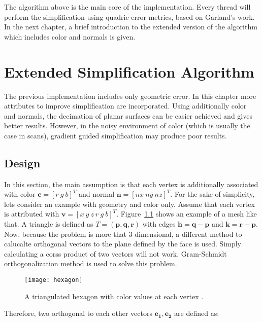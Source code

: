 The algorithm above is the main core of the implementation. Every thread will perform the simplification using quadric error metrics, based on Garland's work. In the next chapter, a brief introduction to the extended version of the algorithm which includes color and normals is given.

\chapter{Extended Simplification Algorithm}

The previous implementation includes only geometric error. In this chapter more attributes to improve simplification are incorporated. Using additionally color and normals, the decimation of planar surfaces can be easier achieved and gives better results. However, in the noisy environment of color (which is usually the case in scans), gradient guided simplification may produce poor results.

\section{Design}
In this section, the main assumption is that each vertex is additionally associated with color $\mathbf{c} = [r \ g \ b]^T$ and normal $\mathbf{n} = [nx \ ny \ nz]^T$. For the sake of simplicity, lets consider an example with geometry and color only. Assume that each vertex is attributed with $\mathbf{v} = [x \ y \ z \ r \ g \ b]^T$. Figure~\ref{fig:hexagon} shows an example of a mesh like that. A triangle is defined as $T = (\mathbf{p}, \mathbf{q}, \mathbf{r})$ with edges $\mathbf{h} = \mathbf{q} - \mathbf{p}$ and $\mathbf{k} = \mathbf{r} - \mathbf{p}$. Now, because the problem is more that 3 dimensional, a different method to calucalte orthogonal vectors to the plane defined by the face is used. Simply calculating a corss product of two vectors will not work. Gram-Schmidt orthogonalization method \cite{strang88} is used to solve this problem.

\begin{figure}[H]
  \begin{center}
    \texttt{[image: hexagon]}
    \caption{A triangulated hexagon with color values at each vertex \cite{garland99}.}
    \label{fig:hexagon}
  \end{center}
\end{figure}

Therefore, two orthogonal to each other vectors $\mathbf{e_1}, \mathbf{e_2}$ are defined as:

